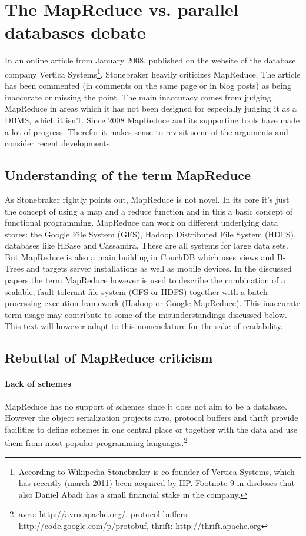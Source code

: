 \documentclass[12pt,a4paper]{scrartcl}		%
\begin{document}
\section{The MapReduce vs. parallel databases debate}
In an online article from January 2008, published on the website of the database company Vertica Systems\footnote
{According to Wikipedia Stonebraker is co-founder of Vertica Systems, which has recently (march 2011) been acquired by HP. Footnote 9 in \cite{journals/pvldb/AbouzeidBARS09} discloses that also Daniel Abadi has a small financial stake in the company.},
Stonebraker heavily criticizes MapReduce.\cite{sto08stepback} The article has been commented (in comments on the same page or in blog posts\cite{Chu-Carrol08hammers}) as being inaccurate or missing the point. The main inaccuracy comes from judging MapReduce in areas which it has not been designed for especially judging it as a DBMS, which it isn't.
Since 2008 MapReduce and its supporting tools have made a lot of progress. Therefor it makes sense to revisit some of the arguments and consider recent developments.
\subsection{Understanding of the term MapReduce}
As Stonebraker rightly points out, MapReduce is not novel. In its core it's just the concept of using a map and a reduce function and in this a basic concept of functional programming. MapReduce can work on different underlying data stores: the Google File System (GFS), Hadoop Distributed File System (HDFS), databases like HBase and Cassandra. These are all systems for large data sets. But MapReduce is also a main building in CouchDB which uses views and B-Trees and targets server installations as well as mobile devices.
In the discussed papers the term MapReduce however is used to describe the combination of a scalable, fault tolerant file system (GFS or HDFS) together with a batch processing execution framework (Hadoop or Google MapReduce).
This inaccurate term usage may contribute to some of the misunderstandings discussed below. This text will however adapt to this nomenclature for the sake of readability.

\subsection{Rebuttal of MapReduce criticism}
\paragraph{Lack of schemes}
MapReduce has no support of schemes since it does not aim to be a database. However the object serialization projects avro, protocol buffers and thrift provide facilities to define schemes in one central place or together with the data and use them from most popular programming languages.\footnote{avro: \url{http://avro.apache.org/}, protocol buffers: \url{http://code.google.com/p/protobuf}, thrift: \url{http://thrift.apache.org}}
\end{document}
